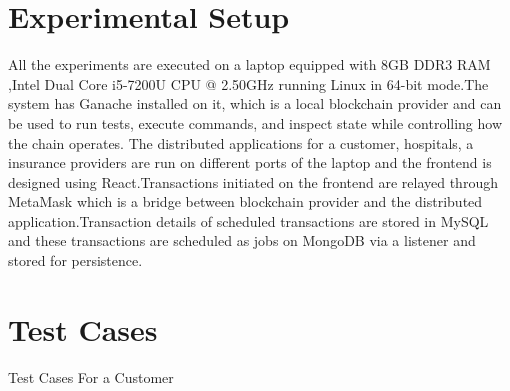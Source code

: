 \section{Experimental Setup}
All the experiments are executed on a laptop equipped with 8GB DDR3 RAM ,Intel Dual Core i5-7200U CPU @ 2.50GHz running Linux in 64-bit mode.The system has Ganache installed on it, which is a local blockchain provider and can be used to run tests, execute commands, and inspect state while controlling how the chain operates. The distributed applications for a customer, hospitals, a insurance providers are run on different ports of the laptop and the frontend is designed using React.Transactions initiated on the frontend are relayed through MetaMask which is a bridge between blockchain provider and the distributed application.Transaction details of scheduled transactions are stored in MySQL and these transactions are scheduled as jobs on MongoDB via a listener and stored for persistence.
\clearpage \section{Test Cases}
Test Cases For a Customer\\

